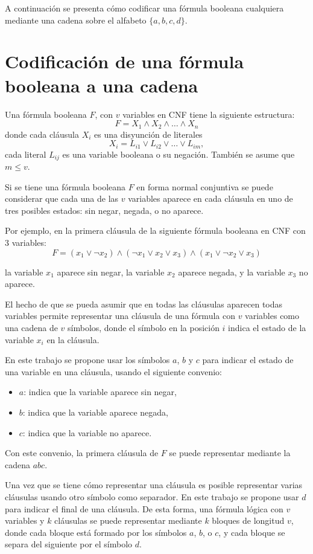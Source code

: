 \documentclass[12pt]{article}
\begin{document}
A continuación se presenta cómo codificar una fórmula booleana cualquiera mediante una cadena sobre el alfabeto $\{a,b,c,d\}$.

\section{Codificación de una fórmula booleana a una cadena}
\label{sec:codsat}

Una fórmula booleana $F$, con $v$ variables en CNF tiene la siguiente estructura:
$$F=X_1 \wedge X_2 \wedge \ldots \wedge X_n$$
donde cada cláusula $X_i$ es una disyunción de literales
$$X_i=L_{i1} \vee L_{i2} \vee \ldots \vee L_{im},$$
cada literal $L_{ij}$ es una variable booleana o su negación. También se asume que $m\leq v$. 

Si se tiene una fórmula booleana $F$ en forma normal conjuntiva se puede considerar que cada una de las $v$ variables aparece en cada cláusula en uno de tres posibles estados: sin negar, negada, o no aparece.

Por ejemplo, en la primera cláusula de la siguiente fórmula booleana en CNF con 3 variables:
$$F=(x_1 \vee \neg x_2) \wedge (\neg x_1 \vee x_2 \vee x_3) \wedge (x_1 \vee \neg x_2 \vee x_3)$$

la variable $x_1$ aparece sin negar, la variable $x_2$ aparece negada, y la variable $x_{3}$ no aparece.

El hecho de que se pueda asumir que en todas las cláusulas aparecen todas variables permite representar una cláusula de una fórmula con $v$ variables como una cadena de $v$ símbolos, donde el símbolo en la posición $i$ indica el estado de la variable $x_i$ en la cláusula.

En este trabajo se propone usar los símbolos $a$, $b$ y $c$ para indicar el estado de una variable en una cláusula, usando el siguiente convenio:

\begin{itemize}
    \item $a$: indica que la variable aparece sin negar,
    \item $b$: indica que la variable aparece negada,
    \item $c$: indica que la variable no aparece.
\end{itemize}

Con este convenio, la primera cláusula de $F$ se puede representar mediante la cadena $abc$.

Una vez que se tiene cómo representar una cláusula es posible representar varias cláusulas usando otro símbolo como separador.
En este trabajo se propone usar $d$ para indicar el final de una cláusula. De esta forma, una fórmula lógica con $v$ variables y $k$ cláusulas se puede representar mediante $k$ bloques de longitud $v$, donde cada bloque está formado por los símbolos $a$, $b$, o $c$, y cada bloque se separa del siguiente por el símbolo $d$.
\end{document}
